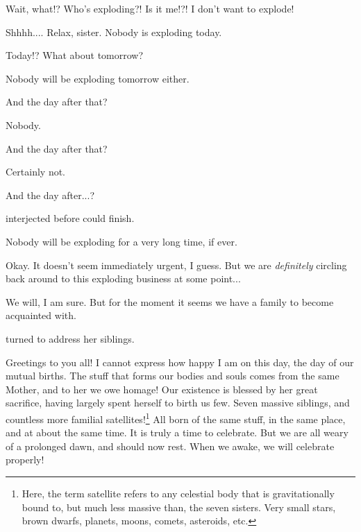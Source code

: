 \documentclass[main.tex]{subfiles}
\begin{document}
\par \Merope Wait, what!?  Who's exploding?!  Is it me!?!  I don't want to explode!

\par \Maia Shhhh....  Relax, sister.  Nobody is exploding today.  

\par \Merope Today!?  What about tomorrow?  

\par \Maia Nobody will be exploding tomorrow either.

\par \Merope And the day after that?

\par \Maia Nobody.

\par \Merope And the day after that?

\par \Maia Certainly not.

\par \Merope And the day after...?

\par \nar \rmmaia interjected before \rmmerope could finish.

\par \Maia Nobody will be exploding for a very long time, if ever.

\par \Merope Okay.  It doesn't seem immediately urgent, I guess. But we are \textit{definitely} circling back around to this exploding business at some point...

\par \Maia We will, I am sure.  But for the moment it seems we have a family to become acquainted with.

\par \nar \rmmaia turned to address her siblings.

\par \Maia Greetings to you all!  I cannot express how happy I am on this day, the day of our mutual births.  The stuff that forms our bodies and souls comes from the same Mother, and to her we owe homage!  Our existence is blessed by her great sacrifice, having largely spent herself to birth us few.  Seven massive siblings, and countless more familial satellites!\footnote{Here, the term satellite refers to any celestial body that is gravitationally bound to, but much less massive than, the seven sisters.  Very small stars, brown dwarfs, planets, moons, comets, asteroids, etc.}  All born of the same stuff, in the same place, and at about the same time.  It is truly a time to celebrate.  But we are all weary of a prolonged dawn, and should now rest.  When we awake, we will celebrate properly!
\end{document}
